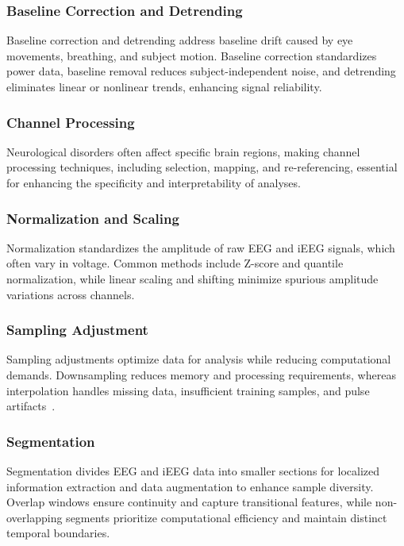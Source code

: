 \subsubsection{Baseline Correction and Detrending} 
Baseline correction and detrending address baseline drift caused by eye movements, breathing, and subject motion. Baseline correction standardizes power data, baseline removal reduces subject-independent noise, and detrending eliminates linear or nonlinear trends, enhancing signal reliability.

\subsubsection{Channel Processing} 
Neurological disorders often affect specific brain regions, making channel processing techniques, including selection, mapping, and re-referencing, essential for enhancing the specificity and interpretability of analyses.

\subsubsection{Normalization and Scaling}
Normalization standardizes the amplitude of raw EEG and iEEG signals, which often vary in voltage. Common methods include Z-score and quantile normalization, while linear scaling and shifting minimize spurious amplitude variations across channels.

\subsubsection{Sampling Adjustment}
Sampling adjustments optimize data for analysis while reducing computational demands. Downsampling reduces memory and processing requirements, whereas interpolation handles missing data, insufficient training samples, and pulse artifacts~\cite{Tuncer2020ANE}.

\subsubsection{Segmentation}
Segmentation divides EEG and iEEG data into smaller sections for localized information extraction and data augmentation to enhance sample diversity.
Overlap windows ensure continuity and capture transitional features, while non-overlapping segments prioritize computational efficiency and maintain distinct temporal boundaries.

